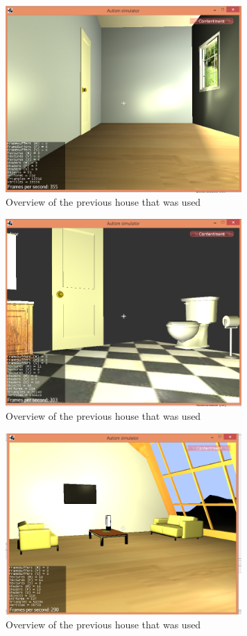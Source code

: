 \documentclass[11pt]{report}
\begin{document}
\begin{figure}[H]
\centering
\includegraphics[width=90mm]{images/new_hallway2.png}
\caption{Overview of the previous house that was used}
\label{old_house}
\end{figure}

\begin{figure}[H]
\centering
\includegraphics[width=90mm]{images/new_bathroom.png}
\caption{Overview of the previous house that was used}
\label{old_house}
\end{figure}

\begin{figure}[H]
\centering
\includegraphics[width=90mm]{images/new_livingroom.png}
\caption{Overview of the previous house that was used}
\label{old_house}
\end{figure}
\end{document}
